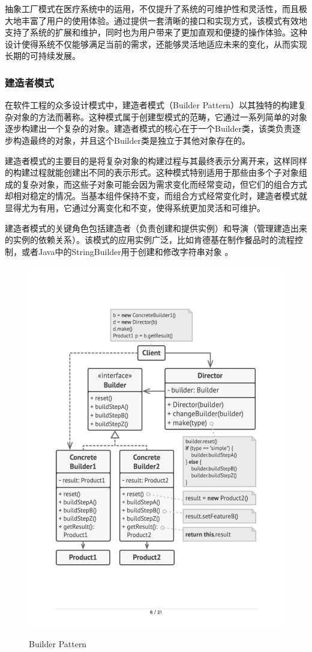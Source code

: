 抽象工厂模式在医疗系统中的运用，不仅提升了系统的可维护性和灵活性，而且极大地丰富了用户的使用体验。通过提供一套清晰的接口和实现方式，该模式有效地支持了系统的扩展和维护，同时也为用户带来了更加直观和便捷的操作体验。这种设计使得系统不仅能够满足当前的需求，还能够灵活地适应未来的变化，从而实现长期的可持续发展。

\subsubsection{建造者模式}
在软件工程的众多设计模式中，建造者模式（Builder Pattern）以其独特的构建复杂对象的方法而著称。这种模式属于创建型模式的范畴，它通过一系列简单的对象逐步构建出一个复杂的对象。建造者模式的核心在于一个Builder类，该类负责逐步构造最终的对象，并且这个Builder类是独立于其他对象存在的。

建造者模式的主要目的是将复杂对象的构建过程与其最终表示分离开来，这样同样的构建过程就能创建出不同的表示形式。这种模式特别适用于那些由多个子对象组成的复杂对象，而这些子对象可能会因为需求变化而经常变动，但它们的组合方式却相对稳定的情况。当基本组件保持不变，而组合方式经常变化时，建造者模式就显得尤为有用，它通过分离变化和不变，使得系统更加灵活和可维护。

建造者模式的关键角色包括建造者（负责创建和提供实例）和导演（管理建造出来的实例的依赖关系）。该模式的应用实例广泛，比如肯德基在制作餐品时的流程控制，或者Java中的StringBuilder用于创建和修改字符串对象
。
\begin{figure}[htbp]
	\centering
	\includegraphics[width=0.5\textheight]{figures/03.pdf}\label{app03}
	\caption{Builder Pattern}
\end{figure}


